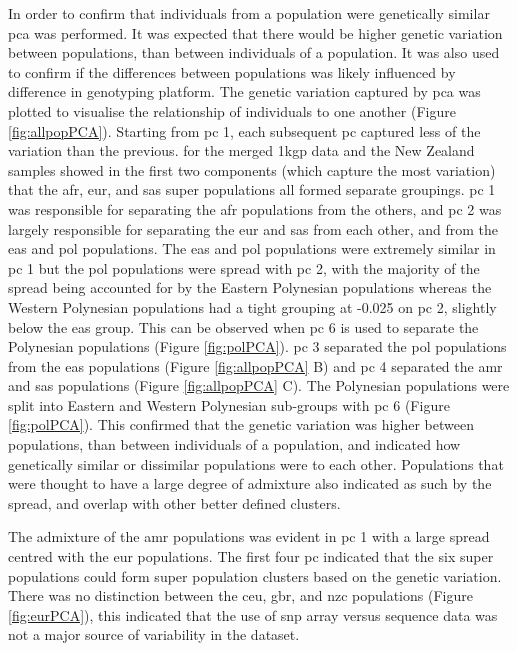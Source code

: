 \documentclass[]{report}
\begin{document}
In order to confirm that individuals from a population were genetically
similar \gls{pca} was performed. It was expected that there would be
higher genetic variation between populations, than between individuals
of a population. It was also used to confirm if the differences between
populations was likely influenced by difference in genotyping platform.
The genetic variation captured by \gls{pca} was plotted to visualise the
relationship of individuals to one another (Figure \ref{fig:allpopPCA}).
Starting from \gls{pc} 1, each subsequent \gls{pc} captured less of the
variation than the previous.  for the merged
\gls{1kgp} data and the New Zealand samples showed in the first two
components (which capture the most variation) that the \gls{afr},
\gls{eur}, and \gls{sas} super populations all formed separate
groupings. \Gls{pc} 1 was responsible for separating the \gls{afr}
populations from the others, and \gls{pc} 2 was largely responsible for
separating the \gls{eur} and \gls{sas} from each other, and from the
\gls{eas} and \gls{pol} populations. The \gls{eas} and \gls{pol}
populations were extremely similar in \gls{pc} 1 but the \gls{pol}
populations were spread with \gls{pc} 2, with the majority of the spread
being accounted for by the Eastern Polynesian populations whereas the
Western Polynesian populations had a tight grouping at -0.025 on
\gls{pc} 2, slightly below the \gls{eas} group. This can be observed
when \gls{pc} 6 is used to separate the Polynesian populations (Figure
\ref{fig:polPCA}). \Gls{pc} 3 separated the \gls{pol} populations from
the \gls{eas} populations (Figure \ref{fig:allpopPCA} B) and \gls{pc} 4
separated the \gls{amr} and \gls{sas} populations (Figure
\ref{fig:allpopPCA} C). The Polynesian populations were split into
Eastern and Western Polynesian sub-groups with \gls{pc} 6 (Figure
\ref{fig:polPCA}). This confirmed that the genetic variation was higher
between populations, than between individuals of a population, and
indicated how genetically similar or dissimilar populations were to each
other. Populations that were thought to have a large degree of admixture
also indicated as such by the spread, and overlap with other better
defined clusters.

The admixture of the \gls{amr} populations \citep{1KGP2015snp} was
evident in \gls{pc} 1 with a large spread centred with the \gls{eur}
populations. The first four \gls{pc} indicated that the six super
populations could form super population clusters based on the genetic
variation. There was no distinction between the \gls{ceu}, \gls{gbr},
and \gls{nzc} populations (Figure \ref{fig:eurPCA}), this indicated that
the use of \gls{snp} array versus sequence data was not a major source
of variability in the dataset.
\end{document}
